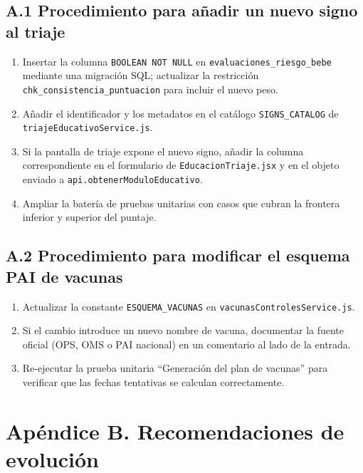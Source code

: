 \documentclass[12pt,letterpaper]{article}
\begin{document}
\subsection*{A.1 Procedimiento para añadir un nuevo signo al triaje}

\begin{enumerate}
    \item Insertar la columna \texttt{BOOLEAN NOT NULL} en \texttt{evaluaciones\_riesgo\_bebe} mediante una migración SQL; actualizar la restricción \texttt{chk\_consistencia\_puntuacion} para incluir el nuevo peso.
    \item Añadir el identificador y los metadatos en el catálogo \texttt{SIGNS\_CATALOG} de \texttt{triajeEducativoService.js}.
    \item Si la pantalla de triaje expone el nuevo signo, añadir la columna correspondiente en el formulario de \texttt{EducacionTriaje.jsx} y en el objeto enviado a \texttt{api.obtenerModuloEducativo}.
    \item Ampliar la batería de pruebas unitarias con casos que cubran la frontera inferior y superior del puntaje.
\end{enumerate}

\subsection*{A.2 Procedimiento para modificar el esquema PAI de vacunas}

\begin{enumerate}
    \item Actualizar la constante \texttt{ESQUEMA\_VACUNAS} en \texttt{vacunasControlesService.js}.
    \item Si el cambio introduce un nuevo nombre de vacuna, documentar la fuente oficial (OPS, OMS o PAI nacional) en un comentario al lado de la entrada.
    \item Re-ejecutar la prueba unitaria ``Generación del plan de vacunas'' para verificar que las fechas tentativas se calculan correctamente.
\end{enumerate}

\section{Apéndice B. Recomendaciones de evolución}
\end{document}

